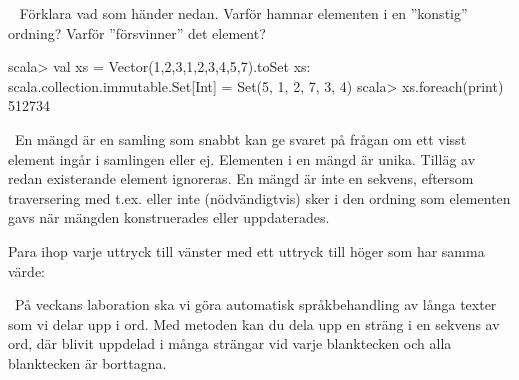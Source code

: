 \begin{ConceptConnections}

\end{ConceptConnections}

\QUESTEND



\QUESTBEGIN

\Task \what~ Förklara vad som händer nedan. Varför hamnar elementen i en ''konstig'' ordning? Varför ''försvinner'' det element?

\begin{REPL}
scala> val xs = Vector(1,2,3,1,2,3,4,5,7).toSet
xs: scala.collection.immutable.Set[Int] = Set(5, 1, 2, 7, 3, 4)
scala> xs.foreach(print)
512734
\end{REPL}

\SOLUTION

\TaskSolved \what~En mängd är en samling som snabbt kan ge svaret på frågan om ett visst element ingår i samlingen eller ej. Elementen i en mängd är unika. Tilläg av redan existerande element ignoreras. En mängd är inte en  sekvens, eftersom traversering med t.ex.  eller  inte (nödvändigtvis) sker i den ordning som elementen gavs när mängden konstruerades eller uppdaterades.

\QUESTEND



\QUESTBEGIN

\Task \what

\vspace{1em}\noindent Para ihop varje uttryck till vänster med ett uttryck till höger som har samma värde:

\begin{ConceptConnections}

\end{ConceptConnections}

\SOLUTION

\TaskSolved \what

\begin{ConceptConnections}

\end{ConceptConnections}

\QUESTEND



\QUESTBEGIN

\Task \what~På veckans laboration ska vi göra automatisk språkbehandling av långa texter som vi delar upp i ord. Med metoden  kan du dela upp en sträng  i en sekvens av ord, där  blivit uppdelad i många strängar vid varje blanktecken och alla blanktecken är borttagna.

